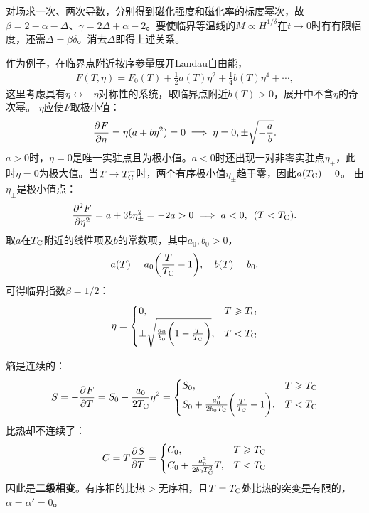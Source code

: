对场求一次、两次导数，分别得到磁化强度和磁化率的标度幂次，故$\beta = 2 - \alpha - \Delta$、$\gamma = 2\Delta + \alpha - 2$。要使临界等温线的$M \propto H^{1/\delta}$在$t \to 0$时有有限幅度，还需$\Delta = \beta\delta$。消去$\Delta$即得上述关系。

作为例子，在临界点附近按序参量展开Landau自由能，
\begin{align}
	F(T,\eta) = F_0(T) + \frac12a(T)\eta^2 + \frac14b(T)\eta^4 + \cdots,
\end{align}
这里考虑具有$\eta \leftrightarrow -\eta$对称性的系统，取临界点附近$b(T) > 0$，展开中不含$\eta$的奇次幂。
$\eta$应使$F$取极小值：
\[
	\pv F\eta = \eta(a + b\eta^2) = 0
	\implies \eta = 0,\pm\sqrt{-\frac ab}.
\]
$a > 0$时，$\eta = 0$是唯一实驻点且为极小值。$a < 0$时还出现一对非零实驻点$\eta_\pm$，此时$\eta = 0$为极大值。当$T \to T_\criticalpoint^-$时，两个有序极小值$\eta_\pm$趋于零，因此$a(T_\criticalpoint) = 0$。
由$\eta_\pm$是极小值点：
\[
	\pv[2]F\eta = a + 3b\eta_\pm^2 = -2a > 0
	\implies a < 0,\enspace (T < T_\criticalpoint).
\]
取$a$在$T_\criticalpoint$附近的线性项及$b$的常数项，其中$a_0,b_0 > 0$，
\[
	a(T) = a_0\biggp{\frac T{T_\criticalpoint} - 1},\quad b(T) = b_0.
\]
可得临界指数$\beta = 1/2$：
\begin{equation}
	\eta =
	\begin{cases}
		0,&T \geqslant T_\criticalpoint\\
		\pm\sqrt{\frac{a_0}{b_0}\biggp{1 - \frac T{T_\criticalpoint}}},&T < T_\criticalpoint
	\end{cases}
\end{equation}
\begin{notecaptionblock}
	\label{fig:Landau free energy}
\end{notecaptionblock}
熵是连续的：
\begin{equation}
	S = -\pv FT = S_0 - \frac{a_0}{2T_\criticalpoint}\eta^2 =
	\begin{cases}
		S_0,                             & T \geqslant T_\criticalpoint \\
		S_0 + \frac{a_0^2}{2b_0T_\criticalpoint}\biggp{\frac T{T_\criticalpoint} - 1}, & T < T_\criticalpoint
	\end{cases}
\end{equation}
比热却不连续了：
\begin{equation}
	C = T\pv ST =
	\begin{cases}
		C_0,                 & T \geqslant T_\criticalpoint \\
		C_0 + \frac{a_0^2}{2b_0T_\criticalpoint^2}T, & T < T_\criticalpoint
	\end{cases}
\end{equation}
因此是\textbf{二级相变}。有序相的比热$>$无序相，且$T = T_\criticalpoint$处比热的突变是有限的，$\alpha = \alpha' = 0$。

